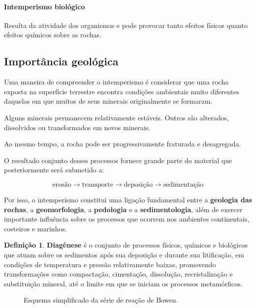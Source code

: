 \documentclass[a4paper,12pt]{article}
\theoremstyle{definition}
\theoremstyle{definition}
\theoremstyle{definition}
\newtheorem{definicao}{Definição}[section]
\begin{document}
\paragraph{Intemperismo biológico}

Resulta da atividade dos organismos e pode provocar tanto efeitos físicos quanto efeitos químicos sobre as rochas.

\subsection{Importância geológica}

Uma maneira de compreender o intemperismo é considerar que uma rocha exposta na superfície terrestre encontra condições ambientais muito diferentes daquelas em que muitos de seus minerais originalmente se formaram.

Alguns minerais permanecem relativamente estáveis. Outros são alterados, dissolvidos ou transformados em novos minerais.

Ao mesmo tempo, a rocha pode ser progressivamente fraturada e desagregada.

O resultado conjunto desses processos fornece grande parte do material que posteriormente será submetido a:

\[
\boxed{
\text{erosão}
\rightarrow
\text{transporte}
\rightarrow
\text{deposição}
\rightarrow
\text{sedimentação}
}
\]

Por isso, o intemperismo constitui uma ligação fundamental entre a \textbf{geologia das rochas}, a \textbf{geomorfologia}, a \textbf{pedologia} e a \textbf{sedimentologia}, além de exercer importante influência sobre os processos que ocorrem nos ambientes continentais, costeiros e marinhos.

\begin{definicao}
    \textbf{Diagênese} é o conjunto de processos físicos, químicos e biológicos que atuam sobre os sedimentos após sua deposição e durante sua litificação, em condições de temperatura e pressão relativamente baixas, promovendo transformações como compactação, cimentação, dissolução, recristalização e substituição mineral, até o limite em que se iniciam os processos metamórficos.
\end{definicao}

\begin{figure}[H]
    \centering
    
    \caption{Esquema simplificado da série de reação de Bowen.}
    \label{fig:bowen}
\end{figure}
\end{document}
